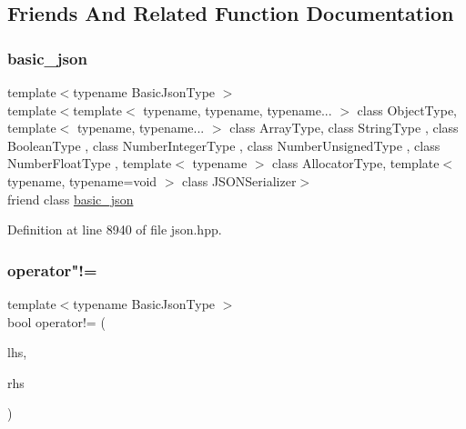 \subsection{Friends And Related Function Documentation}
\mbox{\label{classnlohmann_1_1json__pointer_a95c261a91520bb66a51b6e142a9cf4b3}} 
\subsubsection{\texorpdfstring{basic\+\_\+json}{basic\_json}}
{\footnotesize\ttfamily template$<$typename Basic\+Json\+Type $>$ \\
template$<$template$<$ typename, typename, typename... $>$ class Object\+Type, template$<$ typename, typename... $>$ class Array\+Type, class String\+Type , class Boolean\+Type , class Number\+Integer\+Type , class Number\+Unsigned\+Type , class Number\+Float\+Type , template$<$ typename $>$ class Allocator\+Type, template$<$ typename, typename=void $>$ class J\+S\+O\+N\+Serializer$>$ \\
friend class \hyperlink{classnlohmann_1_1basic__json}{basic\+\_\+json}\hspace{0.3cm}{\ttfamily [friend]}}



Definition at line 8940 of file json.\+hpp.

\mbox{\label{classnlohmann_1_1json__pointer_a6779edcf28e6f018a3bbb29c0b4b5e1e}} 
\subsubsection{\texorpdfstring{operator"!=}{operator!=}}
{\footnotesize\ttfamily template$<$typename Basic\+Json\+Type $>$ \\
bool operator!= (\begin{DoxyParamCaption}\item[{\hyperlink{classnlohmann_1_1json__pointer}{json\+\_\+pointer}$<$ Basic\+Json\+Type $>$ const \&}]{lhs,  }\item[{\hyperlink{classnlohmann_1_1json__pointer}{json\+\_\+pointer}$<$ Basic\+Json\+Type $>$ const \&}]{rhs }\end{DoxyParamCaption})\hspace{0.3cm}{\ttfamily [friend]}}



